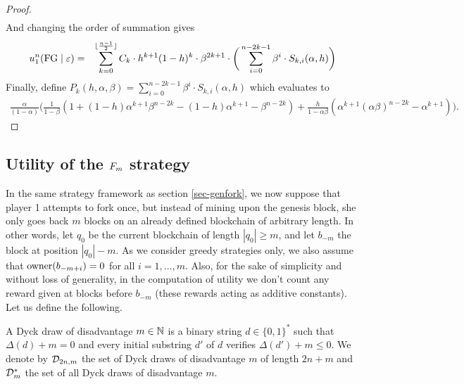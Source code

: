 \begin{proof}
\begin{eqnarray*}
\end{eqnarray*}
And changing the order of summation gives
\begin{eqnarray*}
	u_1^n(\text{\rm FG} \mid \varepsilon)	& = & \sum_{k=0}^{\lfloor\frac{n-1}{2}\rfloor}C_k \cdot h^{k+1}(1-h)^{k}\cdot \beta^{2k+1}\cdot\bigg(\sum_{i=0}^{n-2k-1}\beta^i\cdot  S_{k,i}(\alpha,h)\bigg)
\end{eqnarray*}
Finally, define $P_k(h,\alpha,\beta) = \sum_{i=0}^{n-2k-1}\beta^i\cdot  S_{k,i}(\alpha,h)$
which evaluates to
\begin{eqnarray*}
\frac{\alpha}{(1-\alpha)}\bigg(\frac{1}{1-\beta}(1+(1-h)\alpha^{k+1}\beta^{n-2k}-(1-h)\alpha^{k+1}-\beta^{n-2k})+\frac{h}{1-\alpha\beta}(\alpha^{k+1}(\alpha\beta)^{n-2k}-\alpha^{k+1})\bigg).
\end{eqnarray*}

\end{proof}



\subsection{Utility of the $F_m$ strategy}
\label{sec-mforkutility}


In the same strategy framework as section \ref{sec-genfork}, we now suppose that player 1 attempts to fork once, but instead of mining upon the genesis block, she only goes back $m$ blocks on an already defined blockchain of arbitrary length. In other words, let $q_0$ be the current blockchain of length $|q_0|\geq m$, and let $b_{-m}$ the block at position $|q_0|-m$. As we consider greedy strategies only, we also assume that $\text{\rm owner}(b_{-m+i})=0$ for all $i=1,\dots,m$. Also, for the sake of simplicity and without loss of generality, in the computation of utility we don't count any reward given at blocks before $b_{-m}$ (these rewards acting as additive constants). Let us define the following.
\begin{mydef}
	A Dyck draw of disadvantage $m\in\mathbb{N}$ is a binary string $d\in\{0,1\}^\ast$ such that $\Delta(d)+m=0$ and every initial substring $d'$ of $d$ verifies $\Delta(d')+m\leq 0$. We denote by $\mathcal{D}_{2n,m}$ the set of Dyck draws of disadvantage $m$ of length $2n+m$ and $\mathcal{D}^\ast_{m}$ the set of all Dyck draws of disadvantage $m$.
\end{mydef}


